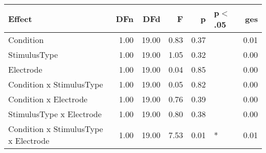 \begin{table}[ht]
\centering
\begin{tabulary}{\textwidth}{lrrrrlr}
  \hline
Effect & DFn & DFd & F & p & p$<$.05 & ges \\ 
  \hline
Condition & 1.00 & 19.00 & 0.83 & 0.37 &  & 0.01 \\ 
  StimulusType & 1.00 & 19.00 & 1.05 & 0.32 &  & 0.00 \\ 
  Electrode & 1.00 & 19.00 & 0.04 & 0.85 &  & 0.00 \\ 
  Condition x StimulusType & 1.00 & 19.00 & 0.05 & 0.82 &  & 0.00 \\ 
  Condition x Electrode & 1.00 & 19.00 & 0.76 & 0.39 &  & 0.00 \\ 
  StimulusType x Electrode & 1.00 & 19.00 & 0.80 & 0.38 &  & 0.00 \\ 
  Condition x StimulusType x Electrode & 1.00 & 19.00 & 7.53 & 0.01 & * & 0.01 \\ 
   \hline
\end{tabulary}
\end{table}

